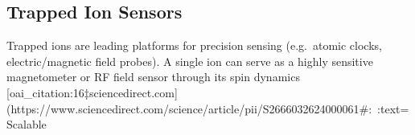 \documentclass[12pt]{article}
\begin{document}
\subsection{Trapped Ion Sensors}
Trapped ions are leading platforms for precision sensing (e.g.\ atomic clocks, electric/magnetic field probes).  A single ion can serve as a highly sensitive magnetometer or RF field sensor through its spin dynamics [oai_citation:16‡sciencedirect.com](https://www.sciencedirect.com/science/article/pii/S2666032624000061#:~:text=Scalable%
\end{document}
